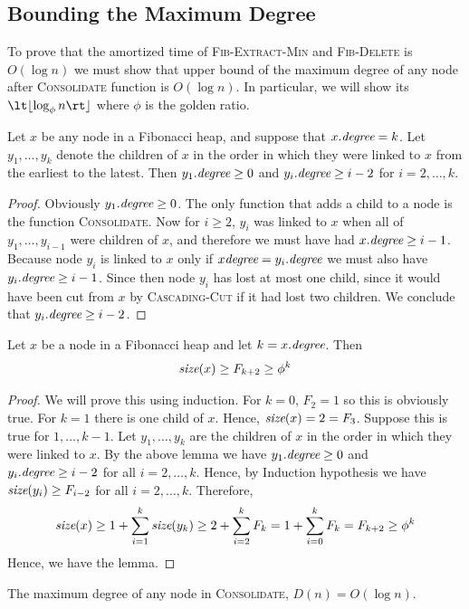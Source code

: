 \subsection{Bounding the Maximum Degree}\label{max-degree-bound}
To prove that the amortized time of \textsc{Fib-Extract-Min} and \textsc{Fib-Delete} is $O(\log n)$ we must show that upper bound of the maximum degree of any node after \textsc{Consolidate} function is $O(\log n)$. In particular, we will show its $\lt\lfloor \log_{\phi}n\rt\rfloor$ where $\phi$ is the golden ratio.
\begin{lemma}{}{}
	Let $x$ be any node in a Fibonacci heap, and suppose that $x.\emph{degree}=k$. Let $y_1,\dots, y_k$ denote the children of $x$ in the order in which they were linked to $x$ from the earliest to the latest. Then $y_1.\emph{degree}\geq 0$ and $y_i.\emph{degree}\geq i-2$ for $i=2,\dots, k$.
\end{lemma}
\begin{proof}
	Obviously $y_1.\emph{degree}\geq 0$. The only function that adds a child to a node is the function \textsc{Consolidate}. Now for $i\geq 2$, $y_i$ was linked to $x$ when all of $y_1,\dots, y_{i-1}$ were children of $x$, and therefore we must have had $x.\emph{degree}\geq i-1$. Because node $y_i$ is linked to $x$ only if $x\emph{degree}=y_i.\emph{degree}$ we must also have $y_i.\emph{degree}\geq i-1$. Since then node $y_i$ has lost at most one child, since it would have been cut from $x$ by \textsc{Cascading-Cut} if it had lost two children. We conclude that $y_i.\emph{degree}\geq i-2$.
\end{proof}
\begin{lemma}{}{}
	Let $x$ be a node in a Fibonacci heap and let $k=x.\emph{degree}$. Then $$\emph{size}(x)\geq F_{k+2}\geq \phi^k$$
\end{lemma}
\begin{proof}
	We will prove this using induction. For $k=0$, $F_2=1$ so this is obviously true. For $k=1$ there is one child of $x$. Hence, $\emph{size}(x)=2=F_3$. Suppose this is true for $1,\dots, k-1$. Let $y_1,\dots, y_k$ are the children of $x$  in the order in which they were linked to $x$. By the above lemma we have $y_1.\emph{degree}\geq 0$ and $y_i.\emph{degree}\geq i-2$ for all $i=2,\dots, k$. Hence, by Induction hypothesis we have $\emph{size}(y_i)\geq F_{i-2}$ for all $i=2,\dots, k$. Therefore, \[
		\emph{size}(x) \geq 1+\sum\limits_{i=1}^{k}\emph{size}(y_k)\geq 2+\sum\limits_{i=2}^kF_{k}=1+\sum\limits_{i=0}^k F_k=F_{k+2}\geq \phi^k
	\]Hence, we have the lemma.
\end{proof}
\begin{corollary}{}{}
	The maximum degree of any node in \textsc{Consolidate}, $D(n)=O(\log n)$.
\end{corollary}
